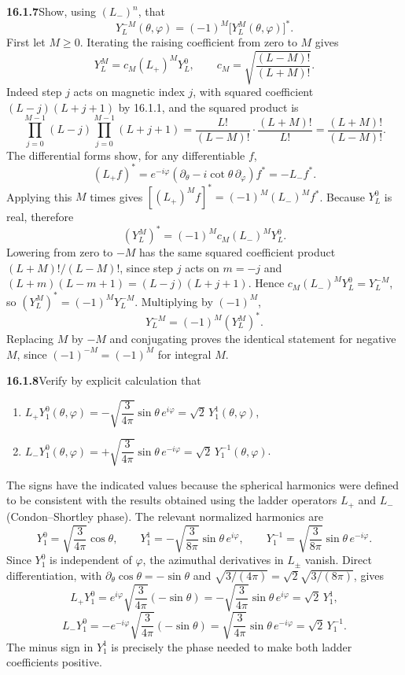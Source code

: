 \par\bigskip
\noindent\textbf{16.1.7}\quad Show, using $(L_{-})^{n}$, that
\[
Y_{L}^{-M}(\theta,\varphi)
=(-1)^{M}\big[Y_{L}^{M}(\theta,\varphi)\big]^{*}.
\]
\solution
First let $M\ge0$. Iterating the raising coefficient from zero to $M$
gives
\[
Y_L^M=c_M(L_+)^M Y_L^0,\qquad
c_M=\sqrt{\frac{(L-M)!}{(L+M)!}}.
\]
Indeed step $j$ acts on magnetic index $j$, with squared coefficient
$(L-j)(L+j+1)$ by 16.1.1, and the squared product is
\[
\prod_{j=0}^{M-1}(L-j)\prod_{j=0}^{M-1}(L+j+1)
=\frac{L!}{(L-M)!}\cdot\frac{(L+M)!}{L!}
=\frac{(L+M)!}{(L-M)!}.
\]
The differential forms show, for any differentiable $f$,
\[
(L_+f)^*
=e^{-i\varphi}(\partial_\theta-i\cot\theta\,\partial_\varphi)f^*
=-L_-f^*.
\]
Applying this $M$ times gives
$[(L_+)^Mf]^*=(-1)^M(L_-)^Mf^*$. Because $Y_L^0$ is real, therefore
\[
(Y_L^M)^*=(-1)^M c_M(L_-)^M Y_L^0.
\]
Lowering from zero to $-M$ has the same squared coefficient product
$(L+M)!/(L-M)!$, since step $j$ acts on $m=-j$ and
$(L+m)(L-m+1)=(L-j)(L+j+1)$. Hence $c_M(L_-)^M Y_L^0=Y_L^{-M}$, so
$(Y_L^M)^*=(-1)^MY_L^{-M}$. Multiplying by $(-1)^M$,
\[
\boxed{Y_L^{-M}=(-1)^M(Y_L^M)^*}.
\]
Replacing $M$ by $-M$ and conjugating proves the identical statement
for negative $M$, since $(-1)^{-M}=(-1)^M$ for integral $M$.

\par\bigskip
\noindent\textbf{16.1.8}\quad Verify by explicit calculation that
\begin{enumerate}
\item[(a)] $L_{+}Y_{1}^{0}(\theta,\varphi)
=-\sqrt{\dfrac{3}{4\pi}}\sin\theta\,e^{i\varphi}
=\sqrt{2}\,Y_{1}^{1}(\theta,\varphi)$,
\item[(b)] $L_{-}Y_{1}^{0}(\theta,\varphi)
=+\sqrt{\dfrac{3}{4\pi}}\sin\theta\,e^{-i\varphi}
=\sqrt{2}\,Y_{1}^{-1}(\theta,\varphi)$.
\end{enumerate}
The signs have the indicated values because the spherical harmonics
were defined to be consistent with the results obtained using the
ladder operators $L_{+}$ and $L_{-}$ (Condon--Shortley phase).
\solution
The relevant normalized harmonics are
\[
Y_1^0=\sqrt{\frac3{4\pi}}\cos\theta,\qquad
Y_1^1=-\sqrt{\frac3{8\pi}}\sin\theta\,e^{i\varphi},\qquad
Y_1^{-1}=\sqrt{\frac3{8\pi}}\sin\theta\,e^{-i\varphi}.
\]
Since $Y_1^0$ is independent of $\varphi$, the azimuthal derivatives
in $L_\pm$ vanish. Direct differentiation, with
$\partial_\theta\cos\theta=-\sin\theta$ and
$\sqrt{3/(4\pi)}=\sqrt2\sqrt{3/(8\pi)}$, gives
\[
L_+Y_1^0=e^{i\varphi}\sqrt{\frac3{4\pi}}(-\sin\theta)
=-\sqrt{\frac3{4\pi}}\sin\theta\,e^{i\varphi}
=\boxed{\sqrt2\,Y_1^1},
\]
\[
L_-Y_1^0=-e^{-i\varphi}\sqrt{\frac3{4\pi}}(-\sin\theta)
=\sqrt{\frac3{4\pi}}\sin\theta\,e^{-i\varphi}
=\boxed{\sqrt2\,Y_1^{-1}}.
\]
The minus sign in $Y_1^1$ is precisely the phase needed to make
both ladder coefficients positive.

